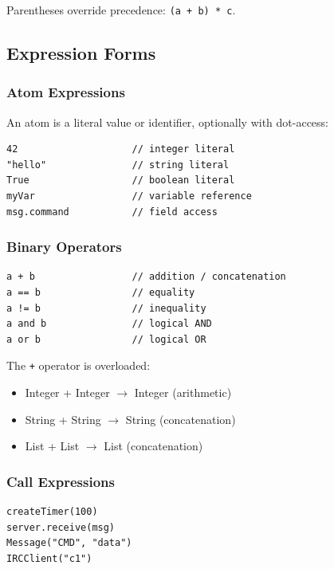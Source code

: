 \documentclass[11pt,letterpaper]{article}
\begin{document}
Parentheses override precedence: \lstinline{(a + b) * c}.

\subsection{Expression Forms}

\subsubsection{Atom Expressions}

An atom is a literal value or identifier, optionally with dot-access:

\begin{lstlisting}[numbers=none]
42                    // integer literal
"hello"               // string literal
True                  // boolean literal
myVar                 // variable reference
msg.command           // field access
\end{lstlisting}

\subsubsection{Binary Operators}

\begin{lstlisting}[numbers=none]
a + b                 // addition / concatenation
a == b                // equality
a != b                // inequality
a and b               // logical AND
a or b                // logical OR
\end{lstlisting}

The \lstinline{+} operator is overloaded:
\begin{itemize}[leftmargin=1.5em]
  \item Integer + Integer $\rightarrow$ Integer (arithmetic)
  \item String + String $\rightarrow$ String (concatenation)
  \item List + List $\rightarrow$ List (concatenation)
\end{itemize}

\subsubsection{Call Expressions}

\begin{lstlisting}[numbers=none]
createTimer(100)
server.receive(msg)
Message("CMD", "data")
IRCClient("c1")
\end{lstlisting}
\end{document}

